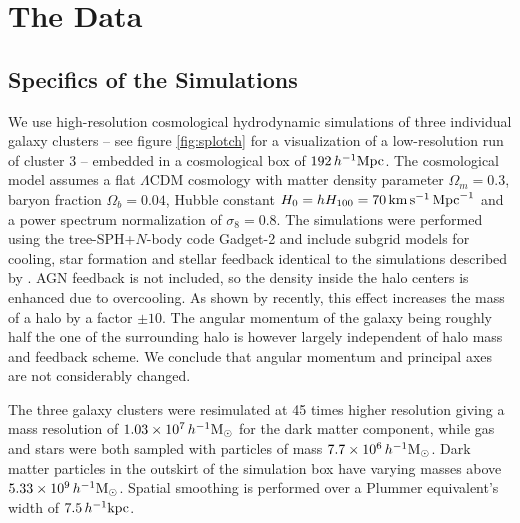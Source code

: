 \documentclass[useAMS,usenatbib]{mn2e}
\begin{document}
\section{The Data}
\label{chap:data}
%
\subsection{Specifics of the Simulations}
%
%
We use high-resolution cosmological hydrodynamic simulations of three
individual galaxy clusters -- see figure \ref{fig:splotch} for a visualization
of a low-resolution run of cluster 3 -- embedded in a cosmological box of
$192\,h^{-1}{\rm Mpc}$. The cosmological model assumes a flat $\Lambda$CDM
cosmology with matter density parameter $\Omega_m =0.3$, baryon fraction
$\Omega_b=0.04$, Hubble constant $H_0=hH_{100}=70\,{\rm km}\,{\rm
  s}^{-1}\,{\rm Mpc}^{-1}$ and a power spectrum normalization of
$\sigma_8=0.8$. The simulations were performed using the tree-SPH+$N$-body
code {\sc Gadget-2} \citep{Springel2005} and include subgrid models for
cooling, star formation and stellar feedback identical to the simulations
described by \cite{Borgani2004}. AGN feedback is not included, so the density
inside the halo centers is enhanced due to overcooling. As shown by
\cite{Sales2010} recently, this effect increases the mass of a halo by a
factor $\pm10$. The angular momentum of the galaxy being roughly half the one
of the surrounding halo is however largely independent of halo mass and
feedback scheme. We conclude that angular momentum and principal axes are not
considerably changed.

The three galaxy clusters were resimulated at 45 times higher resolution
giving a mass resolution of $1.03\times 10^{7}\,h^{-1}{\rm M}_\odot$ for the
dark matter component, while gas and stars were both sampled with particles of
mass $7.7\times 10^6\,h^{-1}{\rm M}_\odot$. Dark matter particles in the
outskirt of the simulation box have varying masses above $5.33\times
10^9\,h^{-1}{\rm M}_\odot$. Spatial smoothing is performed over a Plummer
equivalent's width of $7.5\,h^{-1}{\rm kpc}$.
\end{document}
